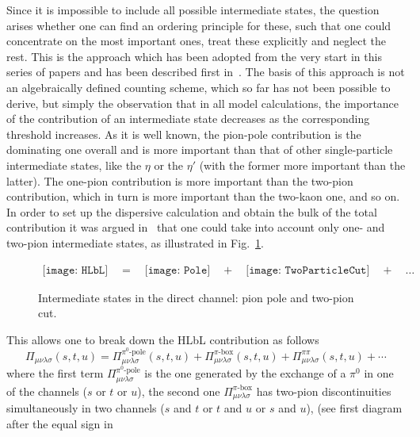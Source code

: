 \documentclass[epj]{webofc}
\newcommand{\<}{\langle}
\renewcommand{\>}{\rangle}
\begin{document}
Since it is impossible to include all possible intermediate states, the
question arises whether one can find an ordering principle for these, such
that one could concentrate on the most important ones, treat these
explicitly and neglect the rest. This is the approach which has been
adopted from the very start in this series of papers and has been described
first in~\cite{Colangelo:2014dfa}. The basis of this approach is not an
algebraically defined counting scheme, which so far has not been possible
to derive, but simply the observation that in all model calculations, the
importance of the contribution of an intermediate state decreases as the
corresponding threshold increases. As it is well known, the pion-pole
contribution is the dominating one overall and is more important than that
of other single-particle intermediate states, like the $\eta$ or the
$\eta'$ (with the former more important than the latter). The one-pion
contribution is more important than the two-pion contribution, which in
turn is more important than the two-kaon one, and so on. In order to set up
the dispersive calculation and obtain the bulk of the total contribution it
was argued in~\cite{Colangelo:2014dfa} that one could take into account
only one- and two-pion intermediate states, as illustrated in
Fig.~\ref{img:HLbLIntermediateStates}.
\begin{figure}[t]
	\centering
	\begin{align*}
		\texttt{[image: HLbL]}
		 \quad = \quad
		\texttt{[image: Pole]}
		 \quad + \quad
		\texttt{[image: TwoParticleCut]}
		\quad + \quad \ldots
	\end{align*}
	\caption{Intermediate states in the direct channel: pion pole and two-pion cut.}
	\label{img:HLbLIntermediateStates}
\end{figure}
This allows one to break down the HLbL
contribution as follows
\begin{equation}
\Pi_{\mu\nu\lambda\sigma}(s,t,u)=\Pi_{\mu\nu\lambda\sigma}^{\pi^0\text{-pole}}(s,t,u)
+\Pi_{\mu\nu\lambda\sigma}^{\pi\text{-box}}(s,t,u) +
\Pi^{\pi \pi}_{\mu\nu\lambda\sigma}(s,t,u) + \cdots 
\end{equation}
where the first term $\Pi_{\mu\nu\lambda\sigma}^{\pi^0\text{-pole}}$ is the
one generated by the exchange of a $\pi^0$ in one of the channels ($s$ or
$t$ or $u$), the second one $\Pi_{\mu\nu\lambda\sigma}^{\pi\text{-box}}$
has two-pion discontinuities simultaneously in two channels ($s$ and $t$ or
$t$ and $u$ or $s$ and $u$), (see first diagram after the equal sign in
\end{document}

